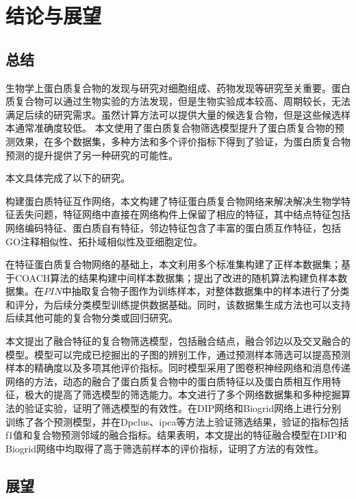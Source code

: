 \chapter{结论与展望}
\label{chapter:SummaryAndForward}

\section{总结}
\label{section:allsummary}

生物学上蛋白质复合物的发现与研究对细胞组成、药物发现等研究至关重要。蛋白质复合物可以通过生物实验的方法发现，但是生物实验成本较高、周期较长，无法满足后续的研究需求。虽然计算方法可以提供大量的候选复合物，但是这些候选样本通常准确度较低。
本文使用了蛋白质复合物筛选模型提升了蛋白质复合物的预测效果，在多个数据集，多种方法和多个评价指标下得到了验证，为蛋白质复合物预测的提升提供了另一种研究的可能性。

本文具体完成了以下的研究。

构建蛋白质特征互作网络，本文构建了特征蛋白质复合物网络来解决解决生物学特征丢失问题，特征网络中直接在网络构件上保留了相应的特征，其中结点特征包括网络编码特征、蛋白质自有特征，邻边特征包含了丰富的蛋白质互作特征，包括GO注释相似性、拓扑域相似性及亚细胞定位。

在特征蛋白质复合物网络的基础上，本文利用多个标准集构建了正样本数据集；基于COACH算法的结果构建中间样本数据集；提出了改进的随机算法构建负样本数据集。在$PIN$中抽取复合物子图作为训练样本，对整体数据集中的样本进行了分类和评分，为后续分类模型训练提供数据基础。同时，该数据集生成方法也可以支持后续其他可能的复合物分类或回归研究。

本文提出了融合特征的复合物筛选模型，包括融合结点，融合邻边以及交叉融合的模型。模型可以完成已挖掘出的子图的辨别工作，通过预测样本筛选可以提高预测样本的精确度以及多项其他评价指标。同时模型采用了图卷积神经网络和消息传递网络的方法，动态的融合了蛋白质复合物中的蛋白质特征以及蛋白质相互作用特征，极大的提高了筛选模型的筛选能力。本文进行了多个网络数据集和多种挖掘算法的验证实验，证明了筛选模型的有效性。在DIP网络和Biogrid网络上进行分别训练了各个预测模型，并在Dpclus、ipca等方法上验证筛选结果，验证的指标包括f1值和复合物预测邻域的融合指标。结果表明，本文提出的特征融合模型在DIP和Biogrid网络中均取得了高于筛选前样本的评价指标，证明了方法的有效性。

\section{展望}
\label{section:forward}

